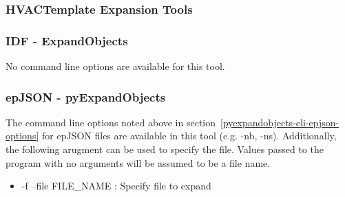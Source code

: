 \subsubsection{HVACTemplate Expansion Tools}

\subsubsection*{IDF - ExpandObjects}

No command line options are available for this tool.

\subsubsection*{epJSON - pyExpandObjects}

The command line options noted above in section~\ref{pyexpandobjects-cli-epjson-options} for epJSON files are available in this tool (e.g. -nb, -ns).  Additionally, the following arugment can be used to specify the file.  Values passed to the program with no arguments will be assumed to be a file name.

\begin{itemize}

\item
  -f --file FILE\_NAME : Specify file to expand
  
\end{itemize}
